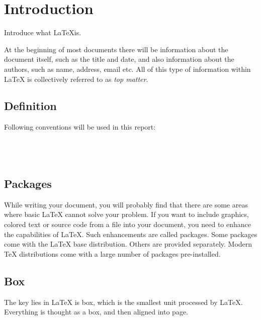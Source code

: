 \chapter{Introduction}
Introduce what \LaTeX is.

At the beginning of most documents there will be information about the
document itself, such as the title and date, and also information about the
authors, such as name, address, email etc. All of this type of information
within LaTeX is collectively referred to as \textit{top matter}. 

\section{Definition}
Following conventions will be used in this report:  \\
   \\
   \\
	    \\

\section{Packages}
While writing your document, you will probably find that there are some
areas where basic LaTeX cannot solve your problem. If you want to include
graphics, colored text or source code from a file into your document, you
need to enhance the capabilities of LaTeX. Such enhancements are called
packages. Some packages come with the LaTeX base distribution. Others are
provided separately. Modern TeX distributions come with a large number of
packages pre-installed. 

\section{Box}
The key lies in \LaTeX{} is box, which is the smallest unit processed by
\LaTeX{}. Everything is thought as a box, and then aligned into page.

